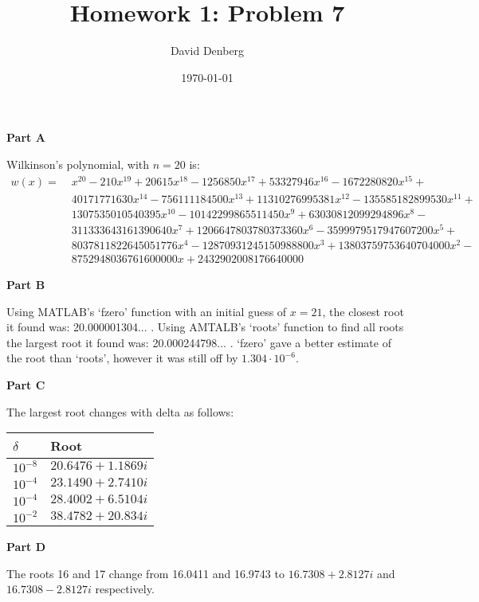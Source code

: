 \documentclass[12pt]{article}
\title{Homework 1: Problem 7}
\author{David Denberg}
\date{\today}
\begin{document}
\maketitle
\noindent
\textbf{Part A}

Wilkinson's polynomial, with $n = 20$ is: 
\begin{align*}
w(x) =\; &x^{20} - 210 x^{19} + 20615 x^{18} - 1256850 x^{17} + 53327946 x^{16} - 1672280820 x^{15} + 
\\
&40171771630 x^{14} - 756111184500 x^{13} + 11310276995381 x^{12} - 135585182899530 x^{11} + 
\\
&1307535010540395 x^{10} - 10142299865511450 x^9 + 63030812099294896 x^8 - 
\\
&311333643161390640 x^7 + 1206647803780373360 x^6 - 3599979517947607200 x^5 +
\\
&8037811822645051776 x^4 - 12870931245150988800 x^3 + 13803759753640704000 x^2 - 
\\
&8752948036761600000 x + 2432902008176640000
\end{align*}

\noindent
\textbf{Part B}

Using MATLAB's `fzero' function with an initial guess of $x = 21$, the closest root it found was: 20.000001304... . Using AMTALB's `roots' function to find all roots the largest root it found was: 20.000244798... . `fzero' gave a better estimate of the root than `roots', however it was still off by $1.304 \cdot 10^{-6}$.

\noindent
\textbf{Part C}

The largest root changes with delta as follows:

\begin{table}[h]
\centering
\begin{tabular}{|l|l|}
\hline
$\delta$      & Root   \\ \hline
$10^{-8}$ & $20.6476 + 1.1869i$ \\ \hline
$10^{-4}$ & $23.1490 + 2.7410i$ \\ \hline
$10^{-4}$ & $28.4002 + 6.5104i$ \\ \hline
$10^{-2}$ & $38.4782 + 20.834i$ \\ \hline
\end{tabular}
\end{table}

\noindent
\textbf{Part D}

The roots 16 and 17 change from 16.0411 and 16.9743 to $16.7308 + 2.8127i$ and $16.7308 - 2.8127i$ respectively.
\end{document}
